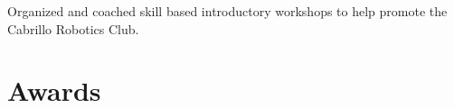 \documentclass[]{deedy-resume-openfont}
\begin{document}
\begin{minipage}[t]{0.66\textwidth}

\begin{tightemize}
\item Organized and coached skill based introductory workshops to help promote the Cabrillo Robotics Club. 
\end{tightemize}
\sectionsep


\section{Awards} 
\sectionsep


\end{minipage} 
\end{document}
